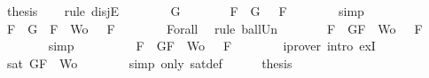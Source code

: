 \begin{isabellebody}
\ {\isacharquery}thesis\isanewline
\ \ \isamarkupfalse%
\ {\isacharparenleft}rule\ disjE{\isacharparenright}\isanewline
\ \ \ \ \isamarkupfalse%
\ {\isachardoublequoteopen}{\isasymA}\ {\isasymTurnstile}\ G{\isachardoublequoteclose}\isanewline
\ \ \ \ \isamarkupfalse%
\ \isamarkupfalse%
\ {\isachardoublequoteopen}{\isasymforall}F\ {\isasymin}\ {\isacharbraceleft}G{\isacharbraceright}{\isachardot}\ {\isasymA}\ {\isasymTurnstile}\ F{\isachardoublequoteclose}\isanewline
\ \ \ \ \ \ \isamarkupfalse%
\ simp\isanewline
\ \ \ \ \isamarkupfalse%
\ \isamarkupfalse%
\ {\isachardoublequoteopen}{\isasymforall}F\ {\isasymin}\ {\isacharparenleft}{\isacharbraceleft}G{\isacharbraceright}\ {\isasymunion}\ {\isacharparenleft}{\isacharbraceleft}F{\isacharbraceright}\ {\isasymunion}\ Wo{\isacharparenright}{\isacharparenright}{\isachardot}\ {\isasymA}\ {\isasymTurnstile}\ F{\isachardoublequoteclose}\isanewline
\ \ \ \ \ \ \isamarkupfalse%
\ Forall{}\ \isamarkupfalse%
\ {\isacharparenleft}rule\ ball{\isacharunderscore}Un{\isacharparenright}\isanewline
\ \ \ \ \isamarkupfalse%
\ \isamarkupfalse%
\ {\isachardoublequoteopen}{\isasymforall}F\ {\isasymin}\ {\isacharbraceleft}G{\isacharcomma}F{\isacharbraceright}\ {\isasymunion}\ Wo{\isachardot}\ {\isasymA}\ {\isasymTurnstile}\ F{\isachardoublequoteclose}\isanewline
\ \ \ \ \ \ \isamarkupfalse%
\ simp\ \isanewline
\ \ \ \ \isamarkupfalse%
\ \isamarkupfalse%
\ {\isachardoublequoteopen}{\isasymexists}{\isasymA}{\isachardot}\ {\isasymforall}F\ {\isasymin}\ {\isacharparenleft}{\isacharbraceleft}G{\isacharcomma}F{\isacharbraceright}\ {\isasymunion}\ Wo{\isacharparenright}{\isachardot}\ {\isasymA}\ {\isasymTurnstile}\ F{\isachardoublequoteclose}\isanewline
\ \ \ \ \ \ \isamarkupfalse%
\ {\isacharparenleft}iprover\ intro{\isacharcolon}\ exI{\isacharparenright}\isanewline
\ \ \ \ \isamarkupfalse%
\ \isamarkupfalse%
\ {\isachardoublequoteopen}sat\ {\isacharparenleft}{\isacharbraceleft}G{\isacharcomma}F{\isacharbraceright}\ {\isasymunion}\ Wo{\isacharparenright}{\isachardoublequoteclose}\isanewline
\ \ \ \ \ \ \isamarkupfalse%
\ {\isacharparenleft}simp\ only{\isacharcolon}\ sat{\isacharunderscore}def{\isacharparenright}\isanewline
\ \ \ \ \isamarkupfalse%
\ {\isacharquery}thesis\isanewline
\ \ \ \ \ \ \isamarkupfalse%

\end{isabellebody}
